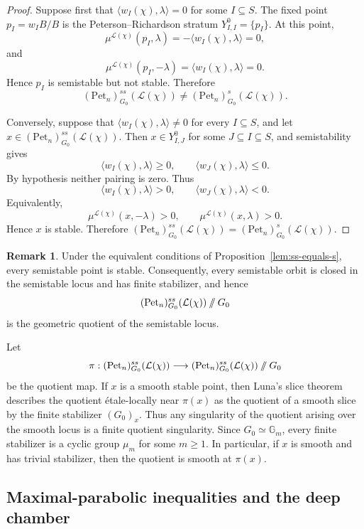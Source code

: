 \documentclass[12pt, reqno]{amsart}
\newcommand{\sslash}{\mathbin{/\mkern-6mu/}}
\theoremstyle{plain}
\numberwithin{equation}{section}
\theoremstyle{definition}
\newtheorem{remark}{Remark}
\begin{document}
\begin{proof}
Suppose first that $\langle w_I(\chi),\lambda\rangle=0$
for some \(I\subseteq S\). The fixed point $p_I=w_IB/B$
is the Peterson--Richardson stratum $Y^0_{I,I}=\{p_I\}.$
At this point,
\[
\mu^{\mathcal L(\chi)}(p_I,\lambda)
=
-\langle w_I(\chi),\lambda\rangle=0,
\]
and
\[
\mu^{\mathcal L(\chi)}(p_I,-\lambda)
=
\langle w_I(\chi),\lambda\rangle=0.
\]
Hence \(p_I\) is semistable but not stable. Therefore
\[
(\mathrm{Pet}_n)^{ss}_{G_0}(\mathcal L(\chi))
\neq
(\mathrm{Pet}_n)^s_{G_0}(\mathcal L(\chi)).
\]

Conversely, suppose that $\langle w_I(\chi),\lambda\rangle\neq0$ for every $I\subseteq S$, and let $x\in(\mathrm{Pet}_n)^{ss}_{G_0}(\mathcal L(\chi)).$
Then \(x\in Y^0_{I,J}\) for some \(J\subseteq I\subseteq S\), and
semistability gives
\[
\langle w_I(\chi),\lambda\rangle\ge0,
\qquad
\langle w_J(\chi),\lambda\rangle\le0.
\]
By hypothesis neither pairing is zero. Thus
\[
\langle w_I(\chi),\lambda\rangle>0,
\qquad
\langle w_J(\chi),\lambda\rangle<0.
\]
Equivalently,
\[
\mu^{\mathcal L(\chi)}(x,-\lambda)>0,
\qquad
\mu^{\mathcal L(\chi)}(x,\lambda)>0.
\]
Hence \(x\) is stable. Therefore $(\mathrm{Pet}_n)^{ss}_{G_0}(\mathcal L(\chi))
=
(\mathrm{Pet}_n)^s_{G_0}(\mathcal L(\chi)).$
\end{proof}

\begin{remark}\label{rem:geometric-quotient}
Under the equivalent conditions of
Proposition~\ref{lem:ss-equals-s}, every semistable point is stable.
Consequently, every semistable orbit is closed in the semistable
locus and has finite stabilizer, and hence
\[
(\mathrm{Pet}_n)^{ss}_{G_0}(\mathcal L(\chi))
\sslash G_0
\]
is the geometric quotient of the semistable locus.

Let
\[
\pi:
(\mathrm{Pet}_n)^{ss}_{G_0}(\mathcal L(\chi))
\longrightarrow
(\mathrm{Pet}_n)^{ss}_{G_0}(\mathcal L(\chi))
\sslash G_0
\]
be the quotient map. If \(x\) is a smooth stable point, then Luna's
slice theorem describes the quotient \'etale-locally near
\(\pi(x)\) as the quotient of a smooth slice by the finite stabilizer
\((G_0)_x\). Thus any singularity of the quotient arising over the
smooth locus is a finite quotient singularity. Since
\(G_0\simeq\mathbb G_m\), every finite stabilizer is a cyclic group
\(\mu_m\) for some \(m\ge1\). In particular, if \(x\) is smooth and has trivial stabilizer, then
the quotient is smooth at \(\pi(x)\). 
\end{remark}

\subsection{Maximal-parabolic inequalities and the deep chamber}
\end{document}
